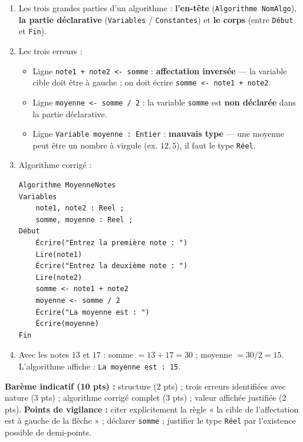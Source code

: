 \documentclass[11pt]{article}
\begin{document}
\begin{corrige}
\begin{enumerate}
\item Les trois grandes parties d'un algorithme : \textbf{l'en-tête} (\texttt{Algorithme NomAlgo}), \textbf{la partie déclarative} (\texttt{Variables} / \texttt{Constantes}) et \textbf{le corps} (entre \texttt{Début} et \texttt{Fin}).
\item Les trois erreurs :
\begin{itemize}
\item Ligne \texttt{note1 + note2 <- somme} : \textbf{affectation inversée} — la variable cible doit être à gauche ; on doit écrire \texttt{somme <- note1 + note2}.
\item Ligne \texttt{moyenne <- somme / 2} : la variable \texttt{somme} est \textbf{non déclarée} dans la partie déclarative.
\item Ligne \texttt{Variable moyenne : Entier} : \textbf{mauvais type} — une moyenne peut être un nombre à virgule (ex. $12,5$), il faut le type \texttt{Réel}.
\end{itemize}
\item Algorithme corrigé :
\begin{lstlisting}
Algorithme MoyenneNotes
Variables
    note1, note2 : Reel ;
    somme, moyenne : Reel ;
Début
    Écrire("Entrez la première note : ")
    Lire(note1)
    Écrire("Entrez la deuxième note : ")
    Lire(note2)
    somme <- note1 + note2
    moyenne <- somme / 2
    Écrire("La moyenne est : ")
    Écrire(moyenne)
Fin
\end{lstlisting}
\item Avec les notes $13$ et $17$ : somme $= 13 + 17 = 30$ ; moyenne $= 30 / 2 = 15$. L'algorithme affiche : \texttt{La moyenne est : 15}.
\end{enumerate}
\textbf{Barème indicatif (10 pts) :} structure (2 pts) ; trois erreurs identifiées avec nature (3 pts) ; algorithme corrigé complet (3 pts) ; valeur affichée justifiée (2 pts).
\textbf{Points de vigilance :} citer explicitement la règle « la cible de l'affectation est à gauche de la flèche » ; déclarer \texttt{somme} ; justifier le type \texttt{Réel} par l'existence possible de demi-points.
\end{corrige}
\end{document}

